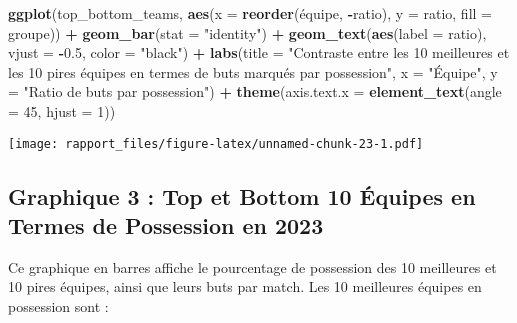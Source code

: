 \documentclass[
]{article}
\newenvironment{Shaded}{\begin{snugshade}}{\end{snugshade}}
\newcommand{\AttributeTok}[1]{\textcolor[rgb]{0.13,0.29,0.53}{#1}}
\newcommand{\DecValTok}[1]{\textcolor[rgb]{0.00,0.00,0.81}{#1}}
\newcommand{\FloatTok}[1]{\textcolor[rgb]{0.00,0.00,0.81}{#1}}
\newcommand{\FunctionTok}[1]{\textcolor[rgb]{0.13,0.29,0.53}{\textbf{#1}}}
\newcommand{\NormalTok}[1]{#1}
\newcommand{\SpecialCharTok}[1]{\textcolor[rgb]{0.81,0.36,0.00}{\textbf{#1}}}
\newcommand{\StringTok}[1]{\textcolor[rgb]{0.31,0.60,0.02}{#1}}
\begin{document}
\begin{Shaded}
\begin{Highlighting}[]
\FunctionTok{ggplot}\NormalTok{(top\_bottom\_teams, }\FunctionTok{aes}\NormalTok{(}\AttributeTok{x =} \FunctionTok{reorder}\NormalTok{(équipe, }\SpecialCharTok{{-}}\NormalTok{ratio), }\AttributeTok{y =}\NormalTok{ ratio, }\AttributeTok{fill =}\NormalTok{ groupe)) }\SpecialCharTok{+}
  \FunctionTok{geom\_bar}\NormalTok{(}\AttributeTok{stat =} \StringTok{"identity"}\NormalTok{) }\SpecialCharTok{+}
  \FunctionTok{geom\_text}\NormalTok{(}\FunctionTok{aes}\NormalTok{(}\AttributeTok{label =}\NormalTok{ ratio), }\AttributeTok{vjust =} \SpecialCharTok{{-}}\FloatTok{0.5}\NormalTok{, }\AttributeTok{color =} \StringTok{"black"}\NormalTok{) }\SpecialCharTok{+}
  \FunctionTok{labs}\NormalTok{(}\AttributeTok{title =} \StringTok{"Contraste entre les 10 meilleures et les 10 pires équipes en termes de buts marqués par possession"}\NormalTok{,}
       \AttributeTok{x =} \StringTok{"Équipe"}\NormalTok{,}
       \AttributeTok{y =} \StringTok{"Ratio de buts par possession"}\NormalTok{) }\SpecialCharTok{+}
  \FunctionTok{theme}\NormalTok{(}\AttributeTok{axis.text.x =} \FunctionTok{element\_text}\NormalTok{(}\AttributeTok{angle =} \DecValTok{45}\NormalTok{, }\AttributeTok{hjust =} \DecValTok{1}\NormalTok{))}
\end{Highlighting}
\end{Shaded}

\texttt{[image: rapport\_files/figure-latex/unnamed-chunk-23-1.pdf]}

\subsection{Graphique 3 : Top et Bottom 10 Équipes en Termes de
Possession en
2023}\label{graphique-3-top-et-bottom-10-uxe9quipes-en-termes-de-possession-en-2023}

Ce graphique en barres affiche le pourcentage de possession des 10
meilleures et 10 pires équipes, ainsi que leurs buts par match. Les 10
meilleures équipes en possession sont :
\end{document}
